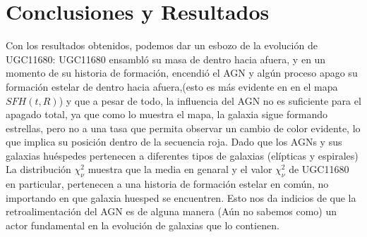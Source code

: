 \documentclass[12pt]{article}
\begin{document}
\section{Conclusiones y Resultados}

Con los resultados obtenidos, podemos dar un esbozo de la evolución de UGC11680: UGC11680 ensambló su masa de dentro hacia afuera, y en un momento de su historia de formación, encendió el AGN y algún proceso apago su formación estelar de dentro hacia afuera,(esto es más evidente en en el mapa $SFH(t,R)$) y que a pesar de todo, la influencia del AGN no es suficiente para el apagado total, ya que como lo muestra el mapa, la galaxia sigue formando estrellas, pero no a una tasa que permita observar un cambio de color evidente, lo que implica su posición dentro de la secuencia roja. Dado que los AGNs y sus galaxias huéspedes pertenecen a diferentes tipos de galaxias (elípticas y espirales) La distribución $\chi^2_{\nu}$ muestra que la media en genaral y el valor  $\chi^2_{\nu}$ de UGC11680 en particular, pertenecen a una historia de formación estelar en común, no importando en que galaxia huesped se encuentren. Esto nos da indicios de que la retroalimentación del AGN es de alguna manera (Aún no sabemos como)  un actor fundamental en la evolución de galaxias que lo contienen.







\end{document}
